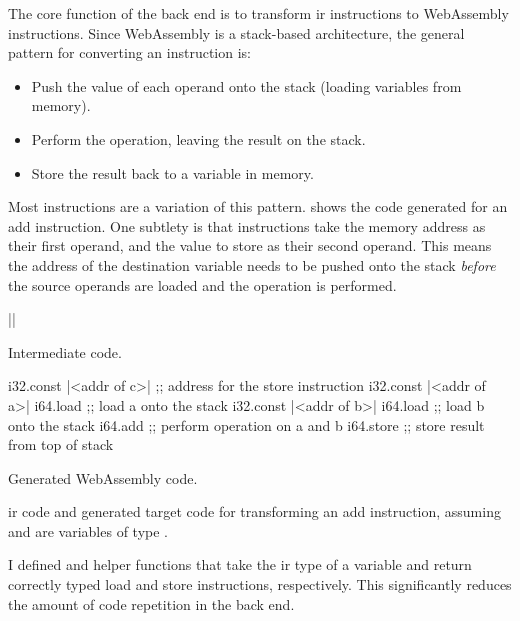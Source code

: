 \documentclass[00-main.tex]{subfiles}
\begin{document}
The core function of the back end is to transform \gls{ir} instructions to WebAssembly instructions.
Since WebAssembly is a stack-based architecture, the general pattern for converting an instruction is:
\begin{itemize}[nosep]
\item Push the value of each operand onto the stack (loading variables from memory).
\item Perform the operation, leaving the result on the stack.
\item Store the result back to a variable in memory.
\end{itemize}
Most instructions are a variation of this pattern.
 shows the code generated for an add instruction.
One subtlety is that  instructions take the memory address as their first operand, and the value to store as their second operand.
This means the address of the destination variable needs to be pushed onto the stack \emph{before} the source operands are loaded and the operation is performed.

\begin{listing}[t]
  \begin{sublisting}[b]{0.28\textwidth}
    \begin{TextListing}
      ||
    \end{TextListing}
    \caption{Intermediate code.}
  \end{sublisting}
  \hfill
  \begin{sublisting}[b]{0.7\textwidth}
    \begin{WasmListing}
      i32.const |<addr of c>|  ;; address for the store instruction
      i32.const |<addr of a>|
      i64.load               ;; load a onto the stack
      i32.const |<addr of b>|
      i64.load               ;; load b onto the stack
      i64.add                ;; perform operation on a and b
      i64.store              ;; store result from top of stack
    \end{WasmListing}
    \caption{Generated WebAssembly code.}
  \end{sublisting}
  \caption{\Gls{ir} code and generated target code for transforming an add instruction, assuming  and  are variables of type .\bigskip}
  \label{lst:converting add instr to wasm code}
\end{listing}

I defined  and  helper functions that take the \gls{ir} type of a variable and return correctly typed load and store instructions, respectively.
This significantly reduces the amount of code repetition in the back end.
\end{document}
